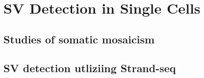 \chapter{SV Detection in Single Cells}
\label{sec:mosaicatcher}

\section{Studies of somatic mosaicism}

\section{SV detection utliziing Strand-seq}
